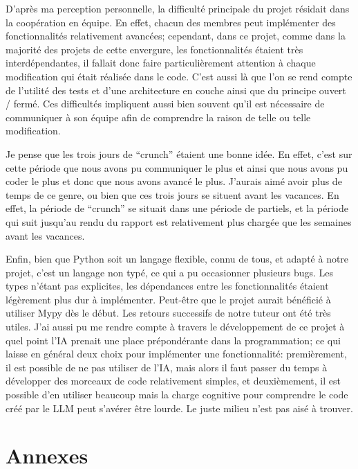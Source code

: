 \documentclass[12pt,a4paper]{article}
\begin{document}
D’après ma perception personnelle, la difficulté principale du projet résidait dans la coopération en équipe. En effet, chacun des membres peut implémenter des fonctionnalités relativement avancées; cependant, dans ce projet, comme dans la majorité des projets de cette envergure, les fonctionnalités étaient très interdépendantes, il fallait donc faire particulièrement attention à chaque modification qui était réalisée dans le code. C'est aussi là que l'on se rend compte de l'utilité des tests et d'une architecture en couche ainsi que du principe ouvert / fermé. Ces difficultés impliquent aussi bien souvent qu'il est nécessaire de communiquer à son équipe afin de comprendre la raison de telle ou telle modification.

Je pense que les trois jours de “crunch” étaient une bonne idée. En effet, c'est sur cette période que nous avons pu communiquer le plus et ainsi que nous avons pu coder le plus et donc que nous avons avancé le plus. J'aurais aimé avoir plus de temps de ce genre, ou bien que ces trois jours se situent avant les vacances. En effet, la période de “crunch” se situait dans une période de partiels, et la période qui suit jusqu'au rendu du rapport est relativement plus chargée que les semaines avant les vacances.

Enfin, bien que Python soit un langage flexible, connu de tous, et adapté à notre projet, c'est un langage non typé, ce qui a pu occasionner plusieurs bugs. Les types n'étant pas explicites, les dépendances entre les fonctionnalités étaient légèrement plus dur à implémenter. Peut-être que le projet aurait bénéficié à utiliser Mypy dès le début. Les retours successifs de notre tuteur ont été très utiles. J'ai aussi pu me rendre compte à travers le développement de ce projet à quel point l’IA prenait une place prépondérante dans la programmation; ce qui laisse en général deux choix pour implémenter une fonctionnalité: premièrement, il est possible de ne pas utiliser de l’IA, mais alors il faut passer du temps à développer des morceaux de code relativement simples, et deuxièmement, il est possible d'en utiliser beaucoup mais la charge cognitive pour comprendre le code créé par le LLM peut s’avérer être lourde. Le juste milieu n'est pas aisé à trouver.
\newpage

\section{Annexes}
\end{document}
